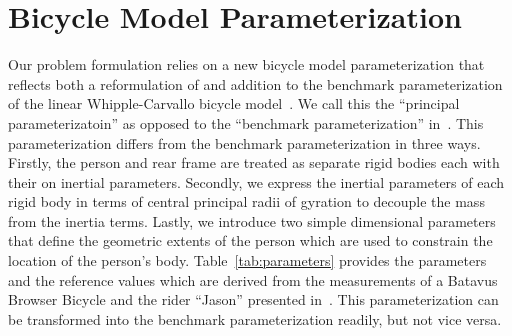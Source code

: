 \documentclass{bmd2019a}
\begin{document}
\section{Bicycle Model Parameterization}
%
Our problem formulation relies on a new bicycle model parameterization that
reflects both a reformulation of and addition to the benchmark parameterization
of the linear Whipple-Carvallo bicycle model~\cite{Meijaard2007}. We call this
the ``principal parameterizatoin'' as opposed to the ``benchmark
parameterization'' in~\cite{Meijaard2007}. This parameterization differs from
the benchmark parameterization in three ways. Firstly, the person and rear
frame are treated as separate rigid bodies each with their on inertial
parameters. Secondly, we express the inertial parameters of each rigid body in
terms of central principal radii of gyration to decouple the mass from the
inertia terms.  Lastly, we introduce two simple dimensional parameters that
define the geometric extents of the person which are used to constrain the
location of the person's body. Table~\ref{tab:parameters} provides the
parameters and the reference values which are derived from the measurements of
a Batavus Browser Bicycle and the rider ``Jason'' presented
in~\cite{Moore2012}. This parameterization can be transformed into the
benchmark parameterization readily, but not vice versa.
%
\end{document}
